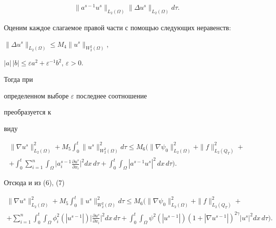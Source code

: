 \begin{pf}
\begin{multline*}
\|a^{s-1}u^s\|_{L_2(\Omega)}


\|\Delta u^s\|_{L_2(\Omega)}d\tau.


\end{multline*}


Оценим каждое слагаемое правой части с помощью следующих неравенств:


$\|\Delta u^s\|_{L_2(\Omega)}\le M_4\|u^s\|_{W^2_2(\Omega)}$,


$|a|\,|b|\le\varepsilon a^2+\varepsilon^{-1}b^2$, $\varepsilon>0$.


Тогда при


определенном выборе $\varepsilon$ последнее соотношение


преобразуется к


виду


\begin{multline*}


\|\nabla u^s\|^2_{L_2(\Omega)}+M_5\int^t_0


\|u^s\|^2_{W^2_2(\Omega)}d\tau\le M_6\biggl(


\|\nabla\psi_0\|^2_{L_2(\Omega)}+


\|f\|^2_{L_2(Q_T)}+\\


+ \int^t_0\sum^n_{i=1}\int_\Omega\biggl|


a^{s-1}_i\frac{\partial u^s}{\partial x_i}\biggr|^2dx\,d\tau+


\int^t_0\int_\Omega|a^{s-1}u^s|^2\,dx\,d\tau\biggr).


\end{multline*}


Отсюда и из (6), (7)


\begin{multline}


\|\nabla u^s\|^2_{L_2(\Omega)}+M_5\int^t_0


\|u^s\|^2_{W^2_2(\Omega)}d\tau\le M_6\biggl(


\|\nabla\psi_0\|^2_{L_2(\Omega)}+


\|f\|^2_{L_2(Q_T)}+ \\


+\sum^n_{i=1}\int^t_0\int_\Omega\phi^2_i(|u^{s-1}|)


\biggl|\frac{\partial u^s}{\partial x_i}\biggr|^2dx\,d\tau+


\int^t_0\int_\Omega\psi^2(|u^{s-1}|)(1+|\nabla u^{s-1}|)^{2\gamma}


|u^s|^2dx\,d\tau\biggr).


\end{multline}



\end{pf}
